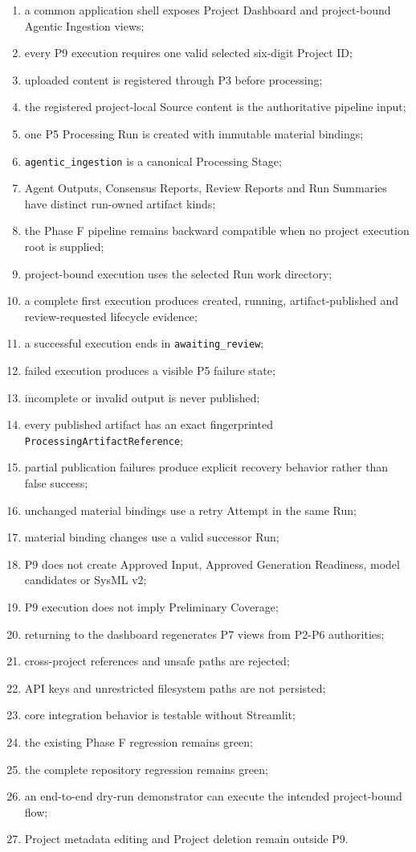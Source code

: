 \begin{enumerate}
\def\labelenumi{\arabic{enumi}.}
\tightlist
\item
  a common application shell exposes Project Dashboard and project-bound Agentic Ingestion views;
\item
  every P9 execution requires one valid selected six-digit Project ID;
\item
  uploaded content is registered through P3 before processing;
\item
  the registered project-local Source content is the authoritative pipeline input;
\item
  one P5 Processing Run is created with immutable material bindings;
\item
  \texttt{agentic\_ingestion} is a canonical Processing Stage;
\item
  Agent Outputs, Consensus Reports, Review Reports and Run Summaries have distinct run-owned artifact kinds;
\item
  the Phase F pipeline remains backward compatible when no project execution root is supplied;
\item
  project-bound execution uses the selected Run work directory;
\item
  a complete first execution produces created, running, artifact-published and review-requested lifecycle evidence;
\item
  a successful execution ends in \texttt{awaiting\_review};
\item
  failed execution produces a visible P5 failure state;
\item
  incomplete or invalid output is never published;
\item
  every published artifact has an exact fingerprinted \texttt{ProcessingArtifactReference};
\item
  partial publication failures produce explicit recovery behavior rather than false success;
\item
  unchanged material bindings use a retry Attempt in the same Run;
\item
  material binding changes use a valid successor Run;
\item
  P9 does not create Approved Input, Approved Generation Readiness, model candidates or SysML v2;
\item
  P9 execution does not imply Preliminary Coverage;
\item
  returning to the dashboard regenerates P7 views from P2-P6 authorities;
\item
  cross-project references and unsafe paths are rejected;
\item
  API keys and unrestricted filesystem paths are not persisted;
\item
  core integration behavior is testable without Streamlit;
\item
  the existing Phase F regression remains green;
\item
  the complete repository regression remains green;
\item
  an end-to-end dry-run demonstrator can execute the intended project-bound flow;
\item
  Project metadata editing and Project deletion remain outside P9.
\end{enumerate}

